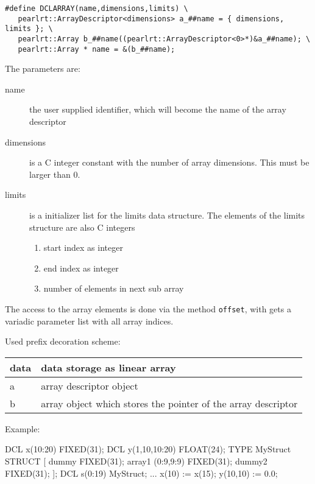\begin{verbatim}
#define DCLARRAY(name,dimensions,limits) \
   pearlrt::ArrayDescriptor<dimensions> a_##name = { dimensions, limits }; \
   pearlrt::Array b_##name((pearlrt::ArrayDescriptor<0>*)&a_##name); \
   pearlrt::Array * name = &(b_##name);
\end{verbatim}

The parameters are:
\begin{description}
\item[name] the user supplied identifier, which will become
    the name  of the array descriptor
\item [dimensions] is a C integer constant with the number of 
   array dimensions. This must be larger than 0.
\item[limits] is a initializer list for the limits data structure.
   The elements of the limits structure are also C integers
   \begin{enumerate}
   \item start index as integer
   \item end index as integer
   \item number of elements in next sub array
   \end{enumerate}
\end{description}

The access to the array elements is done via the method \verb|offset|, 
with gets a variadic parameter list with all array indices.

Used prefix decoration scheme:

\begin{tabular}{|l|l|}
\hline
data & data storage as linear array \\
\hline
a & array descriptor object \\
\hline
b & array object which stores the pointer of the array descriptor \\
\hline
\end{tabular}


Example:

\begin{PEARLCode}
DCL x(10:20) FIXED(31); 
DCL y(1,10,10:20) FLOAT(24); 
TYPE MyStruct STRUCT [
           dummy FIXED(31);
           array1 (0:9,9:9) FIXED(31);
           dummy2 FIXED(31);
           ];
DCL s(0:19) MyStruct;
...
x(10) := x(15);
y(10,10) := 0.0;
\end{PEARLCode}


